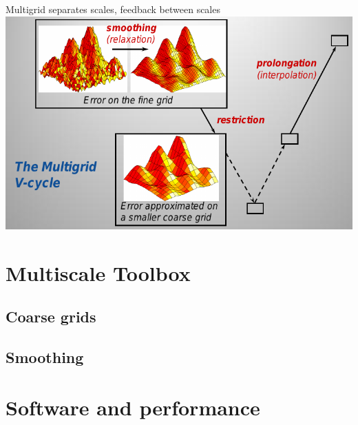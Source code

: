 \documentclass{beamer}
\begin{document}
\begin{frame}{Multigrid separates scales, feedback between scales}
  \includegraphics[width=\textwidth]{figures/YangAMGSummary} \\
\end{frame}



\section{Multiscale Toolbox}


\subsection{Coarse grids}







\subsection{Smoothing}






\section{Software and performance}
\end{document}

